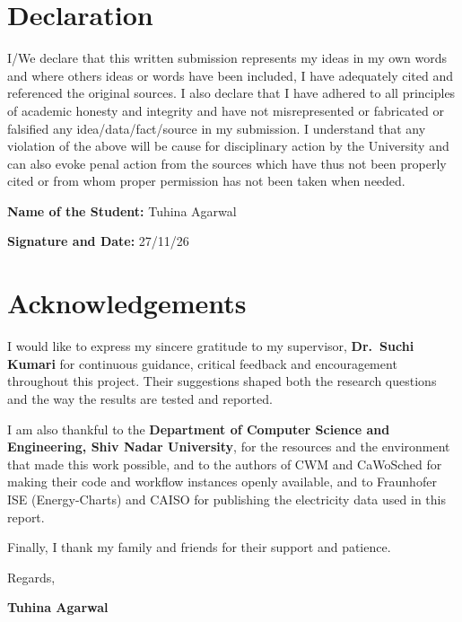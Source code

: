 \documentclass[12pt,a4paper,oneside,openany]{report}
\begin{document}
\chapter*{Declaration}
I/We declare that this written submission represents my ideas in my own
words and where others\textquotesingle{} ideas or words have been
included, I have adequately cited and referenced the original sources. I
also declare that I have adhered to all principles of academic honesty
and integrity and have not misrepresented or fabricated or falsified any
idea/data/fact/source in my submission. I understand that any violation
of the above will be cause for disciplinary action by the University and
can also evoke penal action from the sources which have thus not been
properly cited or from whom proper permission has not been taken when
needed.

\textbf{Name of the Student:} Tuhina Agarwal

\textbf{Signature and Date:} 27/11/26

\clearpage
\chapter*{Acknowledgements}
I would like to express my sincere gratitude to my supervisor,
\textbf{Dr.~Suchi Kumari} for continuous guidance, critical feedback and
encouragement throughout this project. Their suggestions shaped both the
research questions and the way the results are tested and reported.

I am also thankful to the \textbf{Department of Computer Science and
Engineering, Shiv Nadar University}, for the resources and the
environment that made this work possible, and to the authors of CWM and
CaWoSched for making their code and workflow instances openly available,
and to Fraunhofer ISE (Energy-Charts) and CAISO for publishing the
electricity data used in this report.

Finally, I thank my family and friends for their support and patience.

Regards,

\textbf{Tuhina Agarwal}

\clearpage
\tableofcontents

\clearpage
{}
\listoftables

\clearpage
{}
\listoffigures
\end{document}
